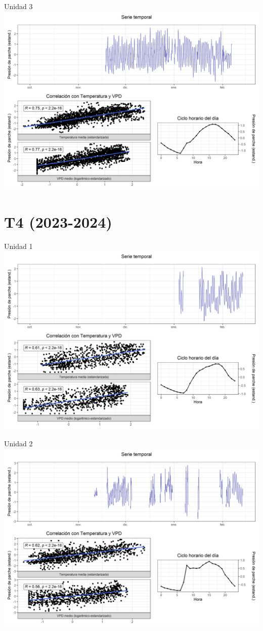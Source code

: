 \documentclass[
  letterpaper,
  DIV=11,
  numbers=noendperiod]{scrreprt}
\begin{document}
Unidad 3
\includegraphics{figuras/04_turgor_unidad/2023_2024_Rio_Claro_T3_Unidad_3.png}

\chapter{T4 (2023-2024)}

Unidad 1
\includegraphics{figuras/04_turgor_unidad/2023_2024_Rio_Claro_T4_Unidad_1.png}

Unidad 2
\includegraphics{figuras/04_turgor_unidad/2023_2024_Rio_Claro_T4_Unidad_2.png}
\end{document}
